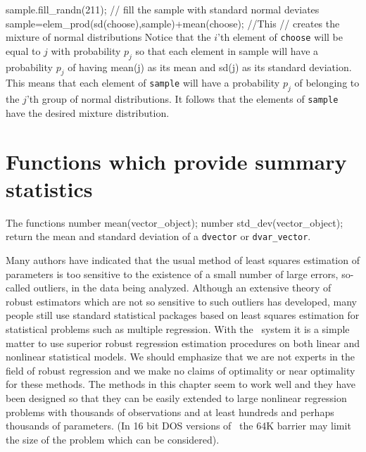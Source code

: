 \documentclass[12pt]{book}
\begin{document}
sample.fill_randn(211); // fill the sample with standard normal deviates
sample=elem_prod(sd(choose),sample)+mean(choose); //This
            // creates the mixture of normal distributions
\endexample
Notice that the $i$'th element of {\tt choose} will be equal to $j$ with
probability $p_j$ so that each element in sample will have
a probability $p_j$ of having mean(j) as its mean and sd(j) as its standard
deviation. This means that each element of {\tt sample} will
have a probability $p_j$ of belonging to the $j$'th group of normal
distributions. It follows that the elements of {\tt sample} have
the desired mixture distribution.
\section{Functions which provide summary statistics}
The functions
\beginexample
number mean(vector_object);
number std_dev(vector_object);
\endexample
\noindent return the mean and standard deviation of a {\tt dvector} or 
{\tt dvar\_vector}.
\endchapter


\htmlnewfile 
\def\mynarrower{\advance\leftskip by 20truept\advance\rightskip by 20truept}
\def\ls{least squares }
\def\ei{\epsilon_i}
\def\mm{least median of squared residuals }
Many authors have indicated that the usual method of least 
squares estimation of parameters is too sensitive to the existence of a 
small number of large errors, so-called outliers, in the data being analyzed.
Although an extensive theory of robust estimators  which are not so 
sensitive to 
such outliers has developed, many people still use standard statistical
packages based on least squares estimation for statistical problems
such as multiple regression. With the \AD\ system it is a simple matter
to use superior
robust regression estimation procedures on both linear and
nonlinear statistical models.
We should emphasize that we are not experts in the field of robust regression
and we make no claims of optimality or near optimality for these methods.
 The methods in this chapter seem to work well and they
have been designed so that they can be easily extended to large 
nonlinear regression problems with thousands of observations
and at least hundreds and perhaps thousands of parameters. 
(In 16 bit DOS versions of \AD\ the 64K barrier may limit the
size of the problem which can be considered).
\end{document}
